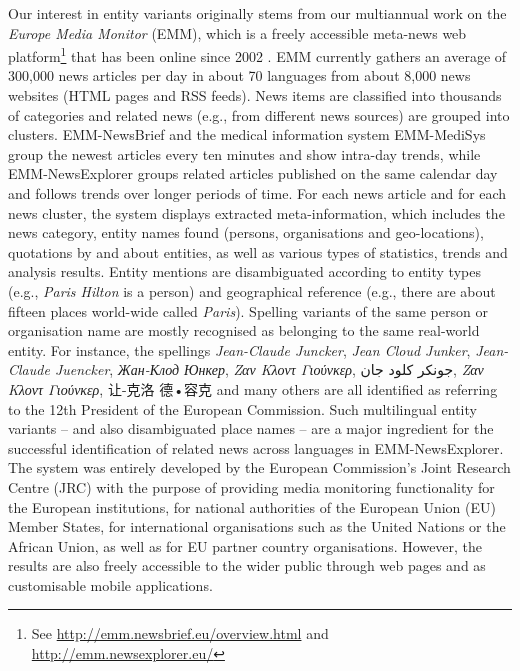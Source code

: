 \documentclass[output=paper]{langsci/langscibook}
\begin{document}
Our interest in entity variants originally stems from our multiannual work on the \textit{Europe Media Monitor} (EMM), which is a freely accessible meta-news web platform\footnote{See \url{http://emm.newsbrief.eu/overview.html} and \url{http://emm.newsexplorer.eu/}} that has been online since 2002 \citep{steinberger-09,steinberger-15}. EMM currently gathers an average of 300,000 news articles per day in about 70 languages from about 8,000 news websites (HTML pages and RSS feeds). News items are classified into thousands of categories 
 and related news (e.g., from different news sources) are grouped into clusters. EMM-NewsBrief and the medical information system EMM-MediSys group the newest articles every ten minutes and show intra-day trends, while EMM-NewsExplorer groups related articles published on the same calendar day and follows trends over longer periods of time. For each news article and for each news cluster, the system displays extracted meta-information, which includes the news category, entity names found (persons, organisations and geo-locations), quotations by and about entities, as well as various types of statistics, trends and analysis results. Entity mentions are disambiguated according to entity types (e.g., \textit{Paris Hilton} is a person) and geographical reference (e.g., there are about fifteen places world-wide called \textit{Paris}). Spelling variants of the same person or organisation name are mostly recognised as belonging to the same real-world entity. For instance, the spellings \textit{Jean-Claude Juncker}, \textit{Jean Cloud Junker}, \textit{Jean-Claude Juencker}, \textit{Жан-Клод Юнкер}, \textit{Ζαν Κλοντ Γιούνκερ}, {\arabicfont جونكر كلود جان}, \textit{Ζαν Κλοντ Γιούνκερ}, {\cn 让-克洛 德•容克}
and many others are all identified as referring to the 12th President of the European Commission. Such multilingual entity variants – and also disambiguated place names – are a major ingredient for the successful identification of related news across languages in EMM-NewsExplorer. The system was entirely developed by the European Commission’s Joint Research Centre (JRC) with the purpose of providing media monitoring functionality for the European institutions, for national authorities of the European Union (EU) Member States, for international organisations such as the United Nations or the African Union, as well as for EU partner country organisations. However, the results are also freely accessible to the wider public through web pages and as customisable mobile applications.
\end{document}
